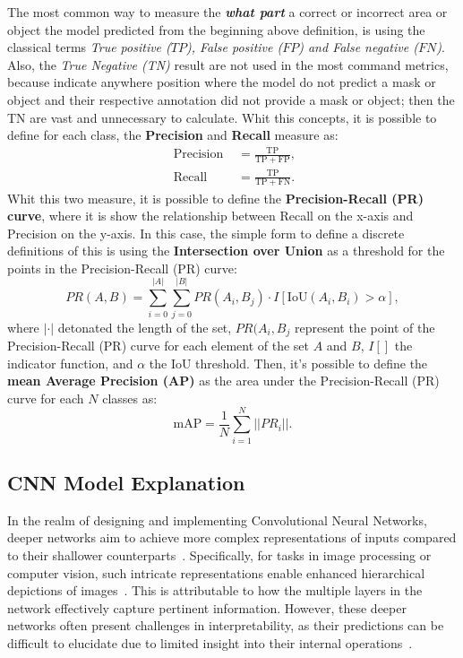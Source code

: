 The most common way to measure the \textit{\textbf{what part}} a correct or incorrect area or object the model predicted from the beginning above definition, is using the classical terms \textit{True positive ($TP$), False positive ($FP$) and False negative ($FN$)}. Also, the \textit{True Negative (TN)} result are not used in the most command metrics, because indicate anywhere position where the model do not predict a mask or object and their respective annotation did not provide a mask or object; then the TN are vast and unnecessary to calculate. Whit this concepts, it is possible to define for each class, the \textbf{Precision} and \textbf{Recall} measure as:
\begin{align}
    \text { Precision }&=\frac{\mathrm{TP}}{\mathrm{TP}+\mathrm{FP}},\\
    \text { Recall }&=\frac{\mathrm{TP}}{\mathrm{TP}+\mathrm{FN}}.
\end{align}
Whit this two measure, it is possible to define the \textbf{Precision-Recall (PR) curve}, where it is show the relationship between Recall on the x-axis and Precision on the y-axis. In this case, the simple form to define a discrete definitions of this is using the \textbf{Intersection over Union} as a threshold for the points in the Precision-Recall (PR) curve:
\begin{equation}
    PR(A, B) = \sum^{|A|}_{i=0}\sum^{|B|}_{j=0}{PR(A_{i}, B_{j})\cdot I\left[ \mathrm{IoU}(A_{i}, B_{i})>\alpha \right]},
\end{equation}
where $|\cdot|$ detonated the length of the set, $PR(A_{i}, B_{j}$ represent the point of the Precision-Recall (PR) curve for each element of the set $A$ and $B$, $I\left[ \right]$ the indicator function, and $\alpha$ the $\mathrm{IoU}$ threshold. Then, it's possible to define the \textbf{mean Average Precision (AP)} as the area under the Precision-Recall (PR) curve for each $N$ classes as:
\begin{equation}
    \mathrm{mAP}=\frac{1}{N} \sum_{i=1}^{N} ||PR_{i}||.
\end{equation}

\subsection{CNN Model Explanation} \label{sec:explanation}
In the realm of designing and implementing Convolutional Neural Networks, deeper networks aim to achieve more complex representations of inputs compared to their shallower counterparts~\cite{Bengio2009}. Specifically, for tasks in image processing or computer vision, such intricate representations enable enhanced hierarchical depictions of images~\cite{DBLP:journals/corr/ZeilerF13}. This is attributable to how the multiple layers in the network effectively capture pertinent information. However, these deeper networks often present challenges in interpretability, as their predictions can be difficult to elucidate due to limited insight into their internal operations~\cite{Jung_2021_ICCV}.\\

